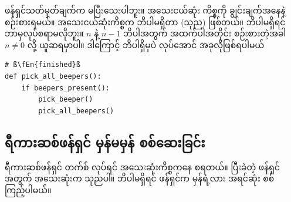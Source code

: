 ဖန်ရှင်သတ်မှတ်ချက်က မပြီးသေးပါဘူး။ အသေးငယ်ဆုံး ကိစ္စကို ချွင်းချက်အနေနဲ့ စဉ်းစားရမယ်။  အသေးငယ်ဆုံးကိစ္စက ဘိပါမရှိတာ (သုည) ဖြစ်တယ်။ ဘိပါမရှိရင် ဘာမှလုပ်စရာမလိုဘူး။ $n$ နဲ့ $n - 1$ ဘိပါအတွက် အထက်ပါအတိုင်း စဉ်းစားတဲ့အခါ $n \neq 0$ လို့ ယူဆရမှာပါ။ ဒါကြောင့် ဘိပါရှိမှပဲ လုပ်အောင် အခုလိုဖြစ်ရပါမယ်

%
\setlength{\fboxsep}{0pt}
\begin{verbatim}
# ß\fEn{finished}ß
def pick_all_beepers():
    if beepers_present():
        pick_beeper()
        pick_all_beepers()
\end{verbatim}
%


\subsection*{ရီကားဆစ်ဖန်ရှင် မှန်မမှန် စစ်ဆေးခြင်း}
ရီကားဆစ်ဖန်ရှင် တက်စ်  လုပ်ရင် အသေးဆုံးကိစ္စကနေ စရတယ်။ ပြီးခဲတဲ့ ဖန်ရှင်အတွက် အသေးဆုံးက သုညပါ။ ဘိပါမရှိရင် ဖန်ရှင်က မှန်ရဲ့လား အရင်ဆုံး စစ်ကြည့်ပါမယ်။

